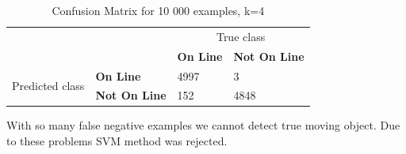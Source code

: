 \begin{center}
\begin{table}[!h]
\renewcommand{\arraystretch}{2}
\begin{tabular}{ p{2cm} p{3cm} p{5cm} p{3cm} | } 
\cline{3-4}
& & \multicolumn{2}{|c|}{True class}\\
\cline{3-4}
 &  & \multicolumn{1}{|l|}{\textbf{On Line}}& \multicolumn{1}{|l|}{\textbf{Not On Line}} \\
\hline
\multicolumn{1}{|l|}{\multirow{2}{4em}{Predicted class}} & \multicolumn{1}{|l|}{\textbf{On Line}} & \multicolumn{1}{|l|}{4997}  & \multicolumn{1}{|l|}{3} \\
\cline{2-4}
\multicolumn{1}{|l|}{} & \multicolumn{1}{|l|}{\textbf{Not On Line}} & \multicolumn{1}{|l|}{152}  & \multicolumn{1}{|l|}{4848}  \\
\hline
\end{tabular}
\renewcommand{\arraystretch}{1}
\caption{Confusion Matrix for 10 000 examples, k=4}
\label{tab:svm_conf_matrix2}
\end{table}
\end{center}

With so many false negative examples we cannot detect true moving object. Due to these problems SVM method was rejected.

    



